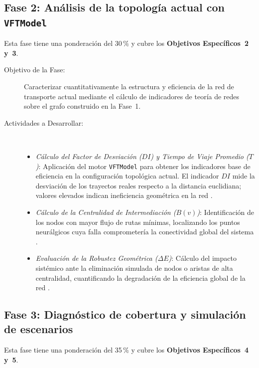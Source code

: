 \subsection{Fase 2: Análisis de la topología actual con \texorpdfstring{\texttt{VFTModel}}{VFTModel}}
\label{subsec:fase2}

Esta fase tiene una ponderación del 30\,\% y cubre los
\textbf{Objetivos Específicos~2 y~3}.

\begin{description}
    \item[Objetivo de la Fase:] Caracterizar cuantitativamente la estructura y
    eficiencia de la red de transporte actual mediante el cálculo de indicadores
    de teoría de redes sobre el grafo construido en la Fase~1.

    \item[Actividades a
    Desarrollar:]~\begin{itemize}
\item \textit{Cálculo del Factor de Desviación ($DI$) y Tiempo de Viaje
        Promedio ($T$)}: Aplicación del motor \texttt{VFTModel}
        \citep{cabrera2026VFTModel} para obtener los indicadores base de
eficiencia en la configuración topológica actual. El indicador $DI$ mide la desviación
de los trayectos reales respecto a la distancia euclidiana; valores
elevados indican ineficiencia geométrica en la red \citep{owais2020}.
        \item \textit{Cálculo de la Centralidad de Intermediación ($B(v)$)}:
Identificación de los nodos con mayor flujo de rutas mínimas, localizando
los puntos neurálgicos cuya falla comprometería la conectividad global del
        sistema \citep{batista2015, lotero2014vulnerabilidad}.
\item \textit{Evaluación de la Robustez Geométrica ($\Delta E$)}: Cálculo
del impacto sistémico ante la eliminación simulada de nodos o aristas de alta
centralidad, cuantificando la degradación de la eficiencia global de la red
        \citep{lotero2014vulnerabilidad}.
    \end{itemize}
\end{description}

\subsection{Fase 3: Diagnóstico de cobertura y simulación de escenarios}
\label{subsec:fase3}

Esta fase tiene una ponderación del 35\,\% y cubre los
\textbf{Objetivos Específicos~4 y~5}.

